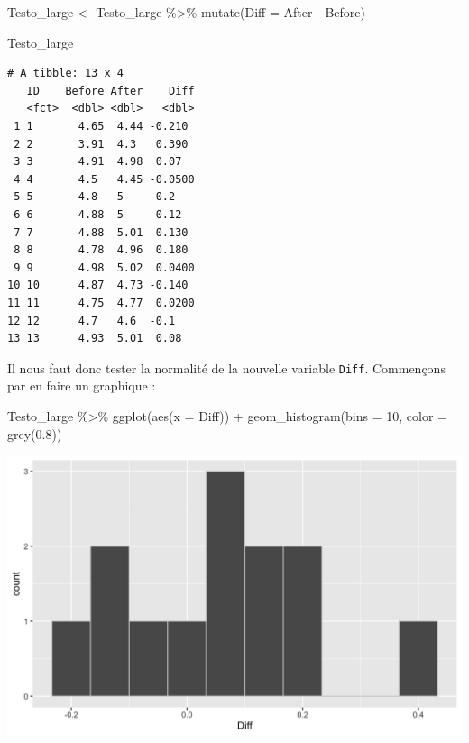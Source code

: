\documentclass[
  a4paper,
]{article}
\newenvironment{Shaded}{\begin{snugshade}}{\end{snugshade}}
\newcommand{\AttributeTok}[1]{\textcolor[rgb]{0.00,0.34,0.68}{#1}}
\newcommand{\DecValTok}[1]{\textcolor[rgb]{0.69,0.50,0.00}{#1}}
\newcommand{\FloatTok}[1]{\textcolor[rgb]{0.69,0.50,0.00}{#1}}
\newcommand{\FunctionTok}[1]{\textcolor[rgb]{0.39,0.29,0.61}{#1}}
\newcommand{\NormalTok}[1]{\textcolor[rgb]{0.12,0.11,0.11}{#1}}
\newcommand{\OtherTok}[1]{\textcolor[rgb]{0.00,0.43,0.16}{#1}}
\newcommand{\SpecialCharTok}[1]{\textcolor[rgb]{0.24,0.68,0.91}{#1}}
\begin{document}
\begin{Shaded}
\begin{Highlighting}[]
\NormalTok{Testo\_large }\OtherTok{\textless{}{-}}\NormalTok{ Testo\_large }\SpecialCharTok{\%\textgreater{}\%} 
  \FunctionTok{mutate}\NormalTok{(}\AttributeTok{Diff =}\NormalTok{ After }\SpecialCharTok{{-}}\NormalTok{ Before)}

\NormalTok{Testo\_large}
\end{Highlighting}
\end{Shaded}

\begin{verbatim}
# A tibble: 13 x 4
   ID    Before After    Diff
   <fct>  <dbl> <dbl>   <dbl>
 1 1       4.65  4.44 -0.210 
 2 2       3.91  4.3   0.390 
 3 3       4.91  4.98  0.07  
 4 4       4.5   4.45 -0.0500
 5 5       4.8   5     0.2   
 6 6       4.88  5     0.12  
 7 7       4.88  5.01  0.130 
 8 8       4.78  4.96  0.180 
 9 9       4.98  5.02  0.0400
10 10      4.87  4.73 -0.140 
11 11      4.75  4.77  0.0200
12 12      4.7   4.6  -0.1   
13 13      4.93  5.01  0.08  
\end{verbatim}

Il nous faut donc tester la normalité de la nouvelle variable \texttt{Diff}. Commençons par en faire un graphique :

\begin{Shaded}
\begin{Highlighting}[]
\NormalTok{Testo\_large }\SpecialCharTok{\%\textgreater{}\%} 
  \FunctionTok{ggplot}\NormalTok{(}\FunctionTok{aes}\NormalTok{(}\AttributeTok{x =}\NormalTok{ Diff)) }\SpecialCharTok{+}
  \FunctionTok{geom\_histogram}\NormalTok{(}\AttributeTok{bins =} \DecValTok{10}\NormalTok{, }\AttributeTok{color =} \FunctionTok{grey}\NormalTok{(}\FloatTok{0.8}\NormalTok{))}
\end{Highlighting}
\end{Shaded}

\begin{center}\includegraphics[width=0.9\linewidth]{figure/unnamed-chunk-38-1} \end{center}
\end{document}
